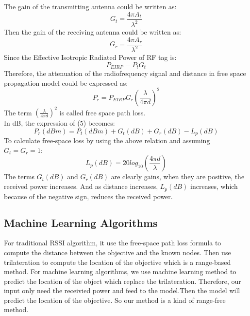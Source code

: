 The gain of the transmitting antenna could be written as:\\
\begin{equation}
 G_{t} = \frac{4 \pi A_{t} }{\lambda^{2}}
\end{equation}
Then the gain of the receiving antenna could be written as:\\
\begin{equation}
 G_{r} = \frac{4 \pi A_{r} }{\lambda^{2}}
\end{equation}
Since the Effective Isotropic Radiated Power of RF tag is:\\
\begin{equation}
 P_{EIRP} = P_{t}G_{t}
\end{equation}
Therefore, the attenuation of the radiofrequency signal and distance in free space propagation model could be expressed as:\\
\begin{equation}
 P_{r} = P_{EIRP} G_{r} (\frac{\lambda }{4\pi d})^{2}
\end{equation}
The term $(\frac{\lambda }{4\pi d})^{2}$ is called free space path loss.\\
In dB, the expression of (5) becomes:\\
\begin{equation}
 P_{r}(dBm) = P_{t}(dBm) + G_{t}(dB) + G_{r}(dB) -L_{p}(dB)
\end{equation}
To calculate free-space loss by using the above relation and assuming $G_t =G_r =1$:\\
\begin{equation}
 L_{p}(dB) = 20 log_{10} (\frac{4 \pi d}{\lambda})
\end{equation}
The terms $G_{t}(dB)$ and $G_{r}(dB)$ are clearly gains, when they are positive, the received power increases. And as distance increases, $L_{p}(dB)$ increases, which because of the negative sign, reduces the received power.\\

\subsection{Machine Learning Algorithms}
For traditional RSSI algorithm, it use the free-space path loss formula to compute the distance between the objective and the known nodes. Then use trilateration to compute the location of the objective which is a range-based method. For machine learning algorithms, we use machine learning method to predict the location of the object which replace the trilateration. Therefore, our input only need the receivied power and feed to the model.Then the model will predict the location of the objective. So our method is a kind of range-free method.

